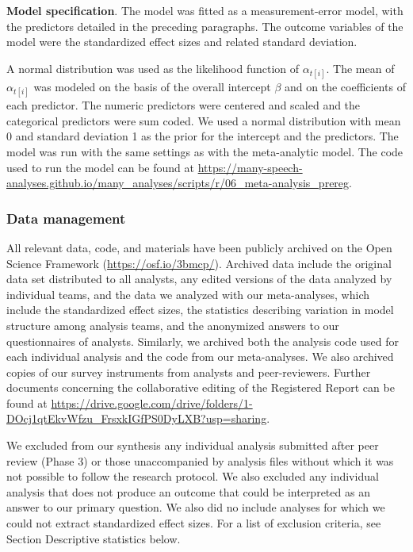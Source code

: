 \documentclass[Review,times,sageh]{sagej}
\begin{document}
\textbf{Model specification}. The model was fitted as a measurement-error model, with the predictors detailed in the preceding paragraphs.
The outcome variables of the model were the standardized effect sizes and related standard deviation.

A normal distribution was used as the likelihood function of \(\alpha_{t[i]}\).
The mean of \(\alpha_{t[i]}\) was modeled on the basis of the overall intercept \(\beta\) and on the coefficients of each predictor.
The numeric predictors were centered and scaled and the categorical predictors were sum coded.
We used a normal distribution with mean 0 and standard deviation 1 as the prior for the intercept and the predictors.
The model was run with the same settings as with the meta-analytic model.
The code used to run the model can be found at \url{https://many-speech-analyses.github.io/many_analyses/scripts/r/06_meta-analysis_prereg}.

\hypertarget{ana-archive}{%
\subsubsection{Data management}\label{ana-archive}}

All relevant data, code, and materials have been publicly archived on the Open Science Framework (\url{https://osf.io/3bmcp/}).
Archived data include the original data set distributed to all analysts, any edited versions of the data analyzed by individual teams, and the data we analyzed with our meta-analyses, which include the standardized effect sizes, the statistics describing variation in model structure among analysis teams, and the anonymized answers to our questionnaires of analysts.
Similarly, we archived both the analysis code used for each individual analysis and the code from our meta-analyses.
We also archived copies of our survey instruments from analysts and peer-reviewers.
Further documents concerning the collaborative editing of the Registered Report can be found at \url{https://drive.google.com/drive/folders/1-DOcj1qtEkvWfzu_FrsxkIGfPS0DyLXB?usp=sharing}.

We excluded from our synthesis any individual analysis submitted after peer review (Phase 3) or those unaccompanied by analysis files without which it was not possible to follow the research protocol.
We also excluded any individual analysis that does not produce an outcome that could be interpreted as an answer to our primary question.
We also did no include analyses for which we could not extract standardized effect sizes. For a list of exclusion criteria, see Section Descriptive statistics below.
\end{document}
